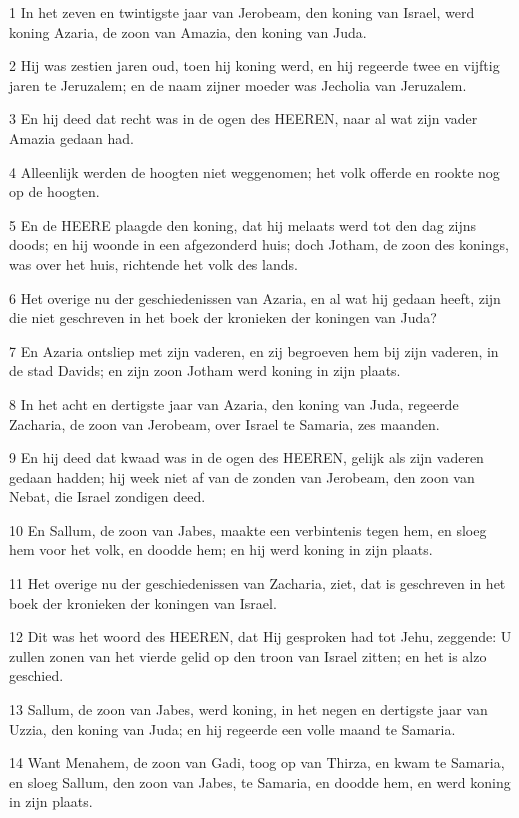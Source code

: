 \par 1 In het zeven en twintigste jaar van Jerobeam, den koning van Israel, werd koning Azaria, de zoon van Amazia, den koning van Juda.
\par 2 Hij was zestien jaren oud, toen hij koning werd, en hij regeerde twee en vijftig jaren te Jeruzalem; en de naam zijner moeder was Jecholia van Jeruzalem.
\par 3 En hij deed dat recht was in de ogen des HEEREN, naar al wat zijn vader Amazia gedaan had.
\par 4 Alleenlijk werden de hoogten niet weggenomen; het volk offerde en rookte nog op de hoogten.
\par 5 En de HEERE plaagde den koning, dat hij melaats werd tot den dag zijns doods; en hij woonde in een afgezonderd huis; doch Jotham, de zoon des konings, was over het huis, richtende het volk des lands.
\par 6 Het overige nu der geschiedenissen van Azaria, en al wat hij gedaan heeft, zijn die niet geschreven in het boek der kronieken der koningen van Juda?
\par 7 En Azaria ontsliep met zijn vaderen, en zij begroeven hem bij zijn vaderen, in de stad Davids; en zijn zoon Jotham werd koning in zijn plaats.
\par 8 In het acht en dertigste jaar van Azaria, den koning van Juda, regeerde Zacharia, de zoon van Jerobeam, over Israel te Samaria, zes maanden.
\par 9 En hij deed dat kwaad was in de ogen des HEEREN, gelijk als zijn vaderen gedaan hadden; hij week niet af van de zonden van Jerobeam, den zoon van Nebat, die Israel zondigen deed.
\par 10 En Sallum, de zoon van Jabes, maakte een verbintenis tegen hem, en sloeg hem voor het volk, en doodde hem; en hij werd koning in zijn plaats.
\par 11 Het overige nu der geschiedenissen van Zacharia, ziet, dat is geschreven in het boek der kronieken der koningen van Israel.
\par 12 Dit was het woord des HEEREN, dat Hij gesproken had tot Jehu, zeggende: U zullen zonen van het vierde gelid op den troon van Israel zitten; en het is alzo geschied.
\par 13 Sallum, de zoon van Jabes, werd koning, in het negen en dertigste jaar van Uzzia, den koning van Juda; en hij regeerde een volle maand te Samaria.
\par 14 Want Menahem, de zoon van Gadi, toog op van Thirza, en kwam te Samaria, en sloeg Sallum, den zoon van Jabes, te Samaria, en doodde hem, en werd koning in zijn plaats.
